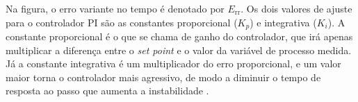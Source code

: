 Na figura, o erro variante no tempo é denotado por $E_\mathrm{rr}$.
Os dois valores de ajuste para o controlador PI são as constantes proporcional ($K_p$)  e integrativa ($K_i$). A constante proporcional é o que se chama de ganho do controlador, que irá apenas multiplicar a diferença entre o \textit{set point} e o valor da variável de processo medida. Já a constante integrativa é um multiplicador do erro proporcional, e um valor maior torna o controlador mais agressivo, de modo a diminuir o tempo de resposta ao passo que aumenta a instabilidade \cite{Apmonitor}.

